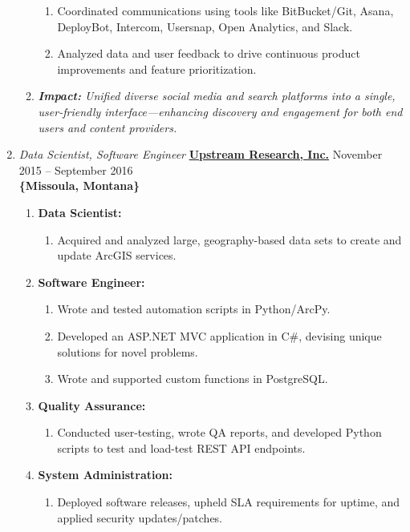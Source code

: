 \documentclass[oneside]{article}%
\begin{document}
\begin{enumerate}[]
\begin{enumerate}[]
\begin{enumerate}[-]
					 \item Coordinated communications using tools like BitBucket/Git, Asana, DeployBot, Intercom, Usersnap, Open Analytics, and Slack.
					 \item Analyzed data and user feedback to drive continuous product improvements and feature prioritization.
				\end{enumerate}
			 \item \textit{\textbf{Impact:} Unified diverse social media and search platforms into a single, user-friendly interface—enhancing discovery and engagement for both end users and content providers.}
		\end{enumerate}

	\item \textit{Data Scientist, Software Engineer} \textbf{\href{https://upstreamresearch.com}{Upstream Research, Inc.}} \hfill November 2015 -- September 2016\\
	\textbf{\{Missoula, Montana\}}
	\begin{enumerate}[]
		\item \textbf{Data Scientist:}
			\begin{enumerate}[-]
				\item Acquired and analyzed large, geography-based data sets to create and update ArcGIS services.
			\end{enumerate}
		\item \textbf{Software Engineer:}
			\begin{enumerate}[-]
				\item Wrote and tested automation scripts in Python/ArcPy.
				\item Developed an ASP.NET MVC application in C\#, devising unique solutions for novel problems.
				\item Wrote and supported custom functions in PostgreSQL.
			\end{enumerate}
		\item \textbf{Quality Assurance:}
			\begin{enumerate}[-]
				\item Conducted user-testing, wrote QA reports, and developed Python scripts to test and load-test REST API endpoints.
			\end{enumerate}
		\item \textbf{System Administration:}
			\begin{enumerate}[-]
				\item Deployed software releases, upheld SLA requirements for uptime, and applied security updates/patches.

\end{enumerate}
\end{enumerate}
\end{enumerate}
\end{document}
